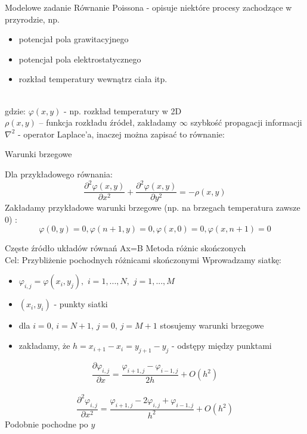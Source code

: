 \begin{frame}{Modelowe zadanie}
    Równanie Poissona - opisuje  niektóre procesy zachodzące w przyrodzie, np.
    \begin{itemize}
        \item potencjał pola grawitacyjnego 
        \item potencjał pola elektrostatycznego 
        \item rozkład temperatury wewnątrz ciała itp. 
     \end{itemize}

    \\
    
   gdzie: $\varphi(x,y)$ - np. rozkład temperatury w 2D\\
   $\rho(x,y)$ -- funkcja rozkładu źródeł, zakładamy $\infty$ szybkość propagacji informacji\\

 $\nabla^2$ - operator Laplace'a, inaczej można zapisać to równanie:\\
  
\end{frame} 
\begin{frame}{Warunki brzegowe}
		
		Dla przykładowego równania:
		$$
		\frac{\partial^2 	\varphi(x,y)}{\partial x^2}+
  \frac {\partial^2	\varphi(x,y)}{\partial y^2}=-\rho(x,y) 
		$$
		Zakładamy przykładowe warunki brzegowe (np. na brzegach temperatura zawsze 0) :
		$$
		\varphi(0,y)=0, \varphi(n+1,y)=0,
		\varphi(x,0)=0, \varphi(x,n+1)=0
		$$
\end{frame}

\begin{frame}{Częste źródło układów równań Ax=B}
Metoda różnic skończonych\\
Cel: Przybliżenie pochodnych różnicami skończonymi
		Wprowadzamy siatkę:
		\begin{itemize}
			\item  $\varphi_{i,j} = \varphi(x_i, y_j),$ $i = 1,...,N,$ $j=1,...,M$
			\item $(x_i, y_i)$ - punkty siatki
			
			\item dla $i=0$, $i=N+1$, $j=0$, $j=M+1$ stosujemy warunki brzegowe \item zakładamy, że $h = x_{i+1}-x_i=y_{j+1}-y_j$ - odstępy między punktami
		\end{itemize}

		$$\frac{\partial \varphi_{i,j}}{\partial x} = \frac{\varphi_{i+1,j} - \varphi_{i-1,j}}{2h} + O(h^2)$$ \\
		$$\frac{\partial^2 \varphi_{i,j}}{\partial x^2} = \frac{\varphi_{i+1,j} - 2 \varphi_{i,j} + \varphi_{i-1,j}}{h^2} + O(h^2)$$
		Podobnie pochodne po $y$
	\end{frame}


